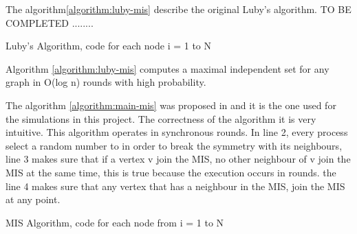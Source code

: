 The algorithm\ref{algorithm:luby-mis} describe the original Luby's algorithm. TO BE COMPLETED ........


\begin{algorithm}
 \caption{Luby's Algorithm, code for each node i = 1 to N}
 \label{algorithm:luby-mis} 

\SetAlgoLined
{}
\end{algorithm} 





\theoremstyle{theorem}
\begin{theorem}

Algorithm \ref{algorithm:luby-mis} computes a maximal independent set for any graph  in O(log n) rounds with high probability.

\end{theorem}


The algorithm \ref{algorithm:main-mis} was proposed in \cite{yves2009optimal} and it is the one used for the simulations in this project. The correctness of the algorithm it is very intuitive. This algorithm operates in synchronous rounds. In line 2, every process select a random number to in order to break the symmetry with its neighbours, line 3 makes sure that if a vertex v join the MIS, no other neighbour of v join the MIS at the same time, this is true because the execution  occurs in rounds. the line 4 makes sure that any vertex that has a neighbour in the MIS, join the MIS at any point. 

\begin{algorithm}
 \caption{MIS Algorithm, code for each node from i = 1 to N}
 \label{algorithm:main-mis} 

\SetAlgoLined
{}
\end{algorithm}

\newpage